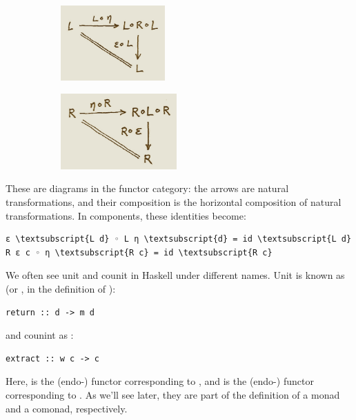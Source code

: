 \begin{figure}[H]
  \centering

  \begin{subfigure}
    \centering
    \includegraphics[width=40mm]{images/triangles.png}
  \end{subfigure}%
  \begin{subfigure}
    \centering
    \includegraphics[width=44.5mm]{images/triangles-2.png}
  \end{subfigure}
\end{figure}

\noindent
These are diagrams in the functor category: the arrows are natural
transformations, and their composition is the horizontal composition of
natural transformations. In components, these identities become:

\begin{Verbatim}[commandchars=\\\{\}]
ε \textsubscript{L d} ◦ L η \textsubscript{d} = id \textsubscript{L d}
R ε c ◦ η \textsubscript{R c} = id \textsubscript{R c}
\end{Verbatim}
We often see unit and counit in Haskell under different names. Unit is
known as  (or , in the definition of
):

\begin{Verbatim}[commandchars=\\\{\}]
return :: d -> m d
\end{Verbatim}
and counint as :

\begin{Verbatim}[commandchars=\\\{\}]
extract :: w c -> c
\end{Verbatim}
Here,  is the (endo-) functor corresponding to ,
and  is the (endo-) functor corresponding to . As
we'll see later, they are part of the definition of a monad and a
comonad, respectively.

